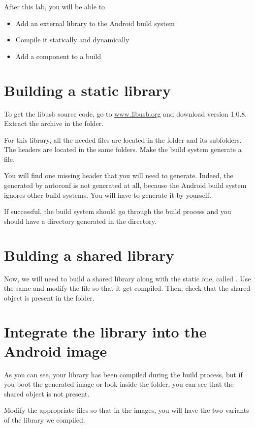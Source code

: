 
After this lab, you will be able to
\begin{itemize}
  \item Add an external library to the Android build system
  \item Compile it statically and dynamically
  \item Add a component to a build
\end{itemize}

\section{Building a static library}

To get the libusb source code, go to \url{www.libusb.org} and download
version 1.0.8. Extract the archive in the  folder.

For this library, all the needed  files are located in the 
folder and its subfolders. The headers are located in the same folders. Make
the build system generate a  file.

You will find one missing header that you will need to generate. Indeed, the
 generated by autoconf is not generated at all, because the
Android build system ignores other build systems. You will have to generate it
by yourself.

If successful, the build system should go through the build process and you
should have a directory generated in the  directory.

\section{Bulding a shared library}

Now, we will need to build a shared library along with the static one, called
. Use the same  and modify the 
file so that it get compiled. Then, check that the shared object is present in
the  folder.

\section{Integrate the library into the Android image}

As you can see, your library has been compiled during the build process, but if
you boot the generated image or look inside the 
folder, you can see that the shared object is not present.

Modify the appropriate files so that in the images, you will have the two 
variants of the library we compiled.
